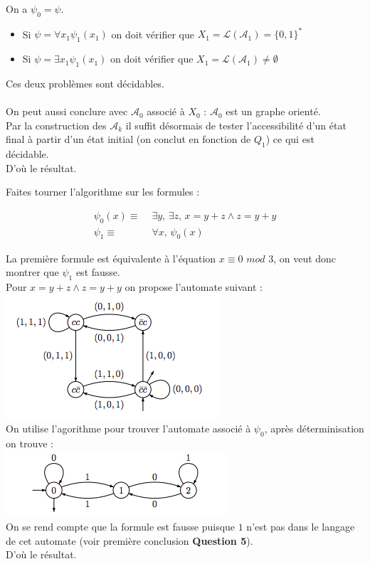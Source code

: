 \documentclass[12pt,letterpaper,boxed]{hmcpset}
\begin{document}
\begin{solution}
On a $\psi_{0} =  \psi$. 
\begin{itemize}
\item Si $\psi = \forall x_{1} \psi_{1}(x_{1})$ on doit vérifier que $X_{1} = \mathcal{L}(\mathcal{A}_{1}) = \{0,1\}^{*}$
\item Si $\psi = \exists x_{1} \psi_{1}(x_{1})$ on doit vérifier que $X_{1} = \mathcal{L}(\mathcal{A}_{1}) \neq \emptyset$
\end{itemize}
Ces deux problèmes sont décidables. \\ \\
On peut aussi conclure avec $\mathcal{A}_{0}$ associé à $X_{0}$ : 
$\mathcal{A}_{0}$ est un graphe orienté. \\
Par la construction des $\mathcal{A}_{k}$ il suffit désormais de tester l'accessibilité d'un état final à partir d'un état initial (on conclut en fonction de $Q_{1}$) ce qui est décidable. \\
D'où le résultat.
\end{solution}
\newpage
\begin{problem}[Question 6]
Faites tourner l'algorithme sur les formules : 

\begin{align*}
\psi_{0}(x) \equiv \, \, & \exists  y, \, \exists z , \, x = y+z \land z = y + y \\
\psi_{1} \equiv \, \, & \forall x , \, \psi_{0}(x)
\end{align*}

\end{problem}

\begin{solution}
La première formule est équivalente à l'équation $x \equiv 0 \, \, mod \, \, 3$, on veut donc montrer que $\psi_{1}$ est fausse. \\
Pour $x = y + z \land z = y + y$ on propose l'automate suivant : \\
\includegraphics{3}
\\
On utilise l'agorithme pour trouver l'automate associé à $\psi_{0}$, après déterminisation on trouve : 
\\
\includegraphics{4}
\\
On se rend compte que la formule est fausse puisque $1$ n'est pas dans le langage de cet automate (voir première conclusion \textbf{Question 5}). \\
D'où le résultat.
\end{solution}
\end{document}
